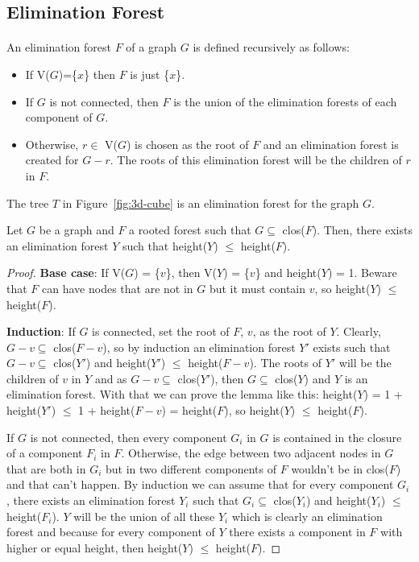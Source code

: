 \subsection{Elimination Forest}
\paragraph{}
An elimination forest $F$ of a graph $G$ is defined recursively as follows:
\begin{itemize}
  \item If V($G$)=\{$x$\} then $F$ is just \{$x$\}.
  \item If $G$ is not connected, then $F$ is the union of the elimination forests of each component of $G$.
  \item Otherwise, $r \in$ V($G$) is chosen as the root of $F$ and an elimination forest is created for $G - r$. The roots of this elimination forest will be the children of $r$ in $F$.
\end{itemize}
The tree $T$ in Figure~\ref{fig:3d-cube} is an elimination forest for the graph $G$.

\begin{lemma}
\label{lema:min-ET}
Let $G$ be a graph and $F$ a rooted forest such that $G \subseteq$ clos($F$). 
Then, there exists an elimination forest $Y$ such that height($Y$) $\leq$ height($F$).
\end{lemma}

\begin{proof}
  \item \textbf{Base case}: If V($G$) = \{$v$\}, then V($Y$) = \{$v$\} and height($Y$) = 1. Beware that $F$ can have nodes that are not in $G$ but it must contain $v$, so height($Y$) $\leq$ height($F$).
  \item \textbf{Induction}: If $G$ is connected, set the root of $F$, $v$, as the root of $Y$. Clearly, $G-v \subseteq$ clos($F-v$), so by induction an elimination forest $Y'$ exists such that $G-v \subseteq$ clos($Y'$) and height($Y'$) $\leq$ height($F-v$). The roots of $Y'$ will be the children of $v$ in $Y$ and as $G-v \subseteq$ clos($Y'$), then $G \subseteq$ clos($Y$) and $Y$ is an elimination forest. With that we can prove the lemma like this: height($Y$) = 1 + height($Y'$) $\leq$ 1 + height($F-v$) = height($F$), so height($Y$) $\leq$ height($F$).
  
  If $G$ is not connected, then every component $G_i$ in $G$ is contained in the closure of a component $F_i$ in $F$. Otherwise, the edge between two adjacent nodes in $G$ that are both in $G_i$ but in two different components of $F$ wouldn't be in clos($F$) and that can't happen. By induction we can assume that for every component $G_i$, there exists an elimination forest $Y_i$ such that $G_i \subseteq$ clos($Y_i$) and height($Y_i$) $\leq$ height($F_i$). $Y$ will be the union of all these $Y_i$ which is clearly an elimination forest and because for every component of $Y$ there exists a component in $F$ with higher or equal height, then height($Y$) $\leq$ height($F$).
\end{proof}

